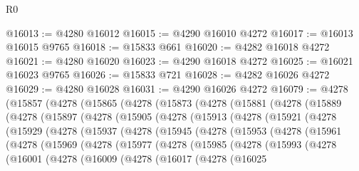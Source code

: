 \begin{lexlean}{R0}
\begin{coremodule}
@16013 := @4280 @16012
@16015 := @4290 @16010 @4272
@16017 := @16013 @16015 @9765
@16018 := @15833 @661
@16020 := @4282 @16018 @4272
@16021 := @4280 @16020
@16023 := @4290 @16018 @4272
@16025 := @16021 @16023 @9765
@16026 := @15833 @721
@16028 := @4282 @16026 @4272
@16029 := @4280 @16028
@16031 := @4290 @16026 @4272
@16079 := @4278
    (@15857
      (@4278
        (@15865
          (@4278
            (@15873
              (@4278
                (@15881
                  (@4278
                    (@15889
                      (@4278
                        (@15897
                          (@4278
                            (@15905
                              (@4278
                                (@15913
                                  (@4278
                                    (@15921
                                      (@4278
                                        (@15929
                                          (@4278
                                            (@15937
                                              (@4278
                                                (@15945
                                                  (@4278
                                                    (@15953
                                                      (@4278
                                                        (@15961
                                                          (@4278
                                                            (@15969
                                                              (@4278
                                                                (@15977
                                                                  (@4278
                                                                    (@15985
                                                                      (@4278
                                                                        (@15993
                                                                          (@4278
                                                                            (@16001
                                                                              (@4278
                                                                                (@16009
                                                                                  (@4278
                                                                                    (@16017
                                                                                      (@4278
                                                                                        (@16025

\end{coremodule}
\end{lexlean}

